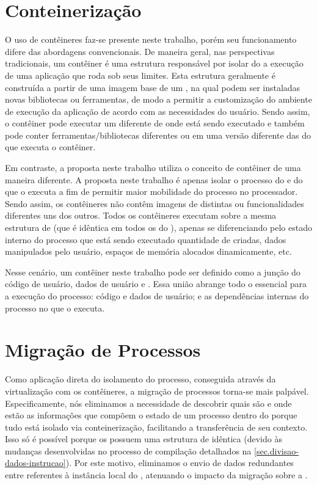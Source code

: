 \section{Conteinerização}
O uso de contêineres faz-se presente neste trabalho, porém seu funcionamento difere das abordagens convencionais. De maneira geral, nas perspectivas tradicionais, um contêiner é uma estrutura responsável por isolar do \so a execução de uma aplicação que roda sob seus limites. Esta estrutura geralmente é construída a partir de uma imagem base de um \so, na qual podem ser instaladas novas bibliotecas ou ferramentas, de modo a permitir a customização do ambiente de execução da aplicação de acordo com as necessidades do usuário. Sendo assim, o contêiner pode executar um \so diferente de onde está sendo executado e também pode conter ferramentas/bibliotecas diferentes ou em uma versão diferente das do \so que executa o contêiner.

Em contraste, a proposta neste trabalho utiliza o conceito de contêiner de uma maneira diferente. A proposta neste trabalho é apenas isolar o processo do  e do \cluster que o executa a fim de permitir maior mobilidade do processo no processador. Sendo assim, os contêineres não contêm imagens de \so distintas ou funcionalidades diferentes uns dos outros. Todos os contêineres executam sobre a mesma estrutura de  (que é idêntica em todos os \clusters do \lw), apenas se diferenciando pelo estado interno do processo que está sendo executado \eg quantidade de \threads criadas, dados manipulados pelo usuário, espaços de memória alocados dinamicamente, etc.

Nesse cenário, um contêiner neste trabalho pode ser definido como a junção do código de usuário, dados de usuário e \uarea. Essa união abrange todo o essencial para a execução do processo: código e dados de usuário; e as dependências internas do processo no \cluster que o executa.


\section{Migração de Processos}
\label{sec.migracao}

Como aplicação direta do isolamento do processo, conseguida através da virtualização com os contêineres, a migração de processos torna-se mais palpável. Especificamente, nós eliminamos a necessidade de descobrir quais são e onde estão as informações que compõem o estado de um processo dentro do \nanvix porque tudo está isolado via conteinerização, facilitando a transferência de seu contexto. Isso só é possível porque os \clusters possuem uma estrutura de  idêntica (devido às mudanças desenvolvidas no processo de compilação detalhados na \autoref{sec.divisao-dados-instrucao}). Por este motivo, eliminamos o envio de dados redundantes entre \clusters referentes à instância local do \os, atenuando o impacto da migração sobre a \noc.

